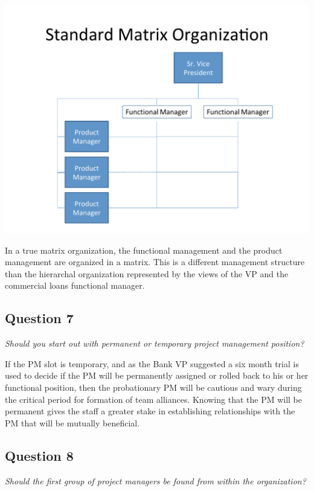\documentclass[letterpaper,10pt]{article}
\begin{document}
\begin{center}
\includegraphics[scale=0.35]{figure2.pdf}
\end{center}

In a true matrix organization, the functional management and the product management are organized in a matrix.  This is a different management structure than the hierarchal organization represented by the views of the VP and the commercial loans functional manager.

\subsection{Question 7}
\emph{Should you start out with permanent or temporary project management position?}\vspace*{1em}

If the PM slot is temporary, and as the Bank VP suggested a six month trial is used to decide if the PM will be permanently assigned or rolled back to his or her functional position, then the probationary PM will be cautious and wary during the critical period for formation of team alliances.  Knowing that the PM will be permanent gives the staff a greater stake in establishing relationships with the PM that will be mutually beneficial. 

\subsection{Question 8}
\emph{Should the first group of project managers be found from within the organization?}\vspace*{1em}
\end{document}
